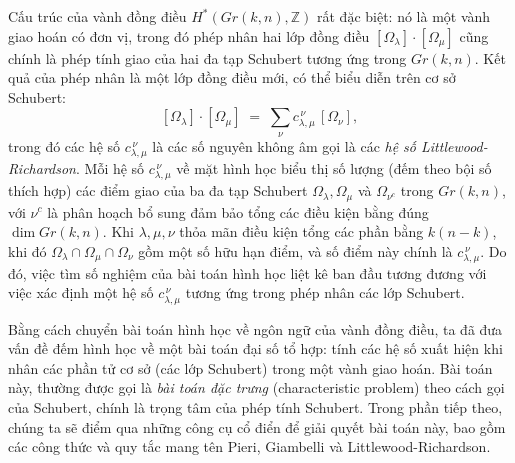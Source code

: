 Cấu trúc của vành đồng điều $H^*(Gr(k,n),\mathbb{Z})$ rất đặc biệt: nó là một vành giao hoán có đơn vị, trong đó phép nhân hai lớp đồng điều $[\Omega_{\lambda}] \cdot [\Omega_{\mu}]$ cũng chính là phép tính giao của hai đa tạp Schubert tương ứng trong $Gr(k,n)$. Kết quả của phép nhân là một lớp đồng điều mới, có thể biểu diễn trên cơ sở Schubert:
\[ [\Omega_{\lambda}] \cdot [\Omega_{\mu}] \;=\; \sum_{\nu} c_{\lambda,\mu}^{\,\nu}\, [\Omega_{\nu}], \]
trong đó các hệ số $c_{\lambda,\mu}^{\,\nu}$ là các số nguyên không âm gọi là các \textit{hệ số Littlewood-Richardson}. Mỗi hệ số $c_{\lambda,\mu}^{\,\nu}$ về mặt hình học biểu thị số lượng (đếm theo bội số thích hợp) các điểm giao của ba đa tạp Schubert $\Omega_{\lambda}, \Omega_{\mu}$ và $\Omega_{\nu^c}$ trong $Gr(k,n)$, với $\nu^c$ là phân hoạch bổ sung đảm bảo tổng các điều kiện bằng đúng $\dim Gr(k,n)$. Khi $\lambda, \mu, \nu$ thỏa mãn điều kiện tổng các phần bằng $k(n-k)$, khi đó $\Omega_{\lambda} \cap \Omega_{\mu} \cap \Omega_{\nu}$ gồm một số hữu hạn điểm, và số điểm này chính là $c_{\lambda,\mu}^{\,\nu}$. Do đó, việc tìm số nghiệm của bài toán hình học liệt kê ban đầu tương đương với việc xác định một hệ số $c_{\lambda,\mu}^{\,\nu}$ tương ứng trong phép nhân các lớp Schubert.

Bằng cách chuyển bài toán hình học về ngôn ngữ của vành đồng điều, ta đã đưa vấn đề đếm hình học về một bài toán đại số tổ hợp: tính các hệ số xuất hiện khi nhân các phần tử cơ sở (các lớp Schubert) trong một vành giao hoán. Bài toán này, thường được gọi là \textit{bài toán đặc trưng} (characteristic problem) theo cách gọi của Schubert, chính là trọng tâm của phép tính Schubert. Trong phần tiếp theo, chúng ta sẽ điểm qua những công cụ cổ điển để giải quyết bài toán này, bao gồm các công thức và quy tắc mang tên Pieri, Giambelli và Littlewood-Richardson.